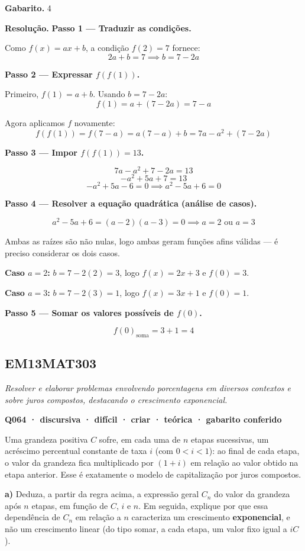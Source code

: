 \documentclass[11pt,a4paper]{article}
\begin{document}
\textbf{Gabarito.} 4

\textbf{Resolução.} \textbf{Passo 1 — Traduzir as condições.}

Como $f(x) = ax+b$, a condição $f(2)=7$ fornece:
$$2a+b=7 \implies b = 7-2a$$

\textbf{Passo 2 — Expressar $f(f(1))$.}

Primeiro, $f(1) = a+b$. Usando $b=7-2a$:
$$f(1) = a + (7-2a) = 7-a$$

Agora aplicamos $f$ novamente:
$$f(f(1)) = f(7-a) = a(7-a)+b = 7a - a^2 + (7-2a)$$

\textbf{Passo 3 — Impor $f(f(1))=13$.}

$$7a - a^2 + 7 - 2a = 13$$
$$-a^2 + 5a + 7 = 13$$
$$-a^2 + 5a - 6 = 0 \implies a^2 - 5a + 6 = 0$$

\textbf{Passo 4 — Resolver a equação quadrática (análise de casos).}

$$a^2-5a+6=(a-2)(a-3)=0 \implies a=2 \text{ ou } a=3$$

Ambas as raízes são não nulas, logo ambas geram funções afins válidas — é preciso considerar os dois casos.

\textbf{Caso $a=2$:} $b = 7-2(2)=3$, logo $f(x)=2x+3$ e $f(0)=3$.

\textbf{Caso $a=3$:} $b = 7-2(3)=1$, logo $f(x)=3x+1$ e $f(0)=1$.

\textbf{Passo 5 — Somar os valores possíveis de $f(0)$.}

$$f(0)_{\text{soma}} = 3+1 = 4$$
\subsection*{EM13MAT303}
{\small\itshape Resolver e elaborar problemas envolvendo porcentagens em diversos contextos e sobre juros compostos, destacando o crescimento exponencial.}

\bigskip\noindent\textbf{Q064 · discursiva · difícil · criar · teórica · gabarito conferido}\par\nopagebreak
Uma grandeza positiva $C$ sofre, em cada uma de $n$ etapas sucessivas, um acréscimo percentual constante de taxa $i$ (com $0<i<1$): ao final de cada etapa, o valor da grandeza fica multiplicado por $(1+i)$ em relação ao valor obtido na etapa anterior. Esse é exatamente o modelo de capitalização por juros compostos.

\textbf{a)} Deduza, a partir da regra acima, a expressão geral $C_n$ do valor da grandeza após $n$ etapas, em função de $C$, $i$ e $n$. Em seguida, explique por que essa dependência de $C_n$ em relação a $n$ caracteriza um crescimento \textbf{exponencial}, e não um crescimento linear (do tipo somar, a cada etapa, um valor fixo igual a $iC$).
\end{document}
